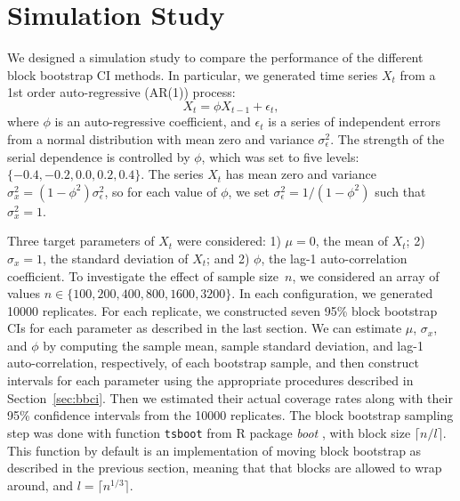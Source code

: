 \documentclass[12pt, letterpaper, titlepage]{article}
\begin{document}
\section{Simulation Study}
\label{sec:simu}


We designed a simulation study to compare the performance of the different
block
bootstrap CI methods. In particular, we generated time series $X_t$
from a 1st order auto-regressive (AR(1)) process:
\[
X_t = \phi X_{t-1} + \epsilon_t,
\]
where $\phi$ is an auto-regressive coefficient, and $\epsilon_t$ is a series of
independent errors from a normal distribution with mean zero and variance
$\sigma_{\epsilon}^2$. The strength of the serial dependence is controlled by
$\phi$, which was set to five levels: $\{-0.4, -0.2, 0.0, 0.2, 0.4\}$.
The series $X_t$ has mean zero and variance
$\sigma_x^2 = (1 - \phi^2) \sigma_{\epsilon}^2$, so for each value of $\phi$,
we
set $\sigma_{\epsilon}^2 = 1 / (1 - \phi^2)$ such that $\sigma_x^2 = 1$.


Three target parameters of $X_t$ were considered:
1) $\mu = 0$, the mean of $X_t$;
2) $\sigma_x = 1$, the standard deviation of $X_t$; and
2) $\phi$, the lag-1 auto-correlation coefficient.
To investigate the effect of sample size~$n$, we considered an array of values
$n \in \{100, 200, 400, 800, 1600, 3200\}$. In each configuration, we generated 
10000 replicates. For each replicate, we constructed seven 95\% block
bootstrap CIs for each parameter as described in the last section. We can
estimate $\mu$, $\sigma_x$, and $\phi$ by computing the sample mean,
sample 
standard deviation,
and lag-1 auto-correlation, respectively, of each bootstrap sample, and then 
construct intervals for each parameter using the appropriate procedures
described in Section~\ref{sec:bbci}.
Then we estimated their actual coverage rates along with their 95\% confidence
intervals from the 10000 replicates. The block bootstrap sampling step was done
with function \texttt{tsboot} from R package \textsl{boot} \citep{boot}, with
block size $\lceil n / l \rceil$. This function by default is an implementation
of moving block bootstrap as described in the previous section, meaning that
that blocks are allowed to wrap around, and $l = \lceil n^{1/3} \rceil$.
\end{document}
